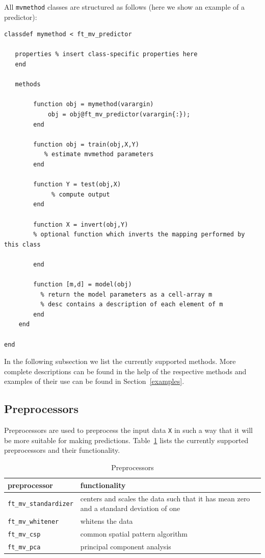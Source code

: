 \documentclass{article}
\renewcommand{\t}[1]{{\tt #1}}
\begin{document}
All \t{mvmethod} classes are structured as follows (here we show an example of a predictor):
\begin{verbatim}
classdef mymethod < ft_mv_predictor
 
   properties % insert class-specific properties here
   end
 
   methods
 
        function obj = mymethod(varargin)       
         	obj = obj@ft_mv_predictor(varargin{:});
        end        
 
        function obj = train(obj,X,Y)
           % estimate mvmethod parameters
        end
 
        function Y = test(obj,X)
        	 % compute output     
        end
 	
        function X = invert(obj,Y)
        % optional function which inverts the mapping performed by this class
        
        end
 
        function [m,d] = model(obj)
          % return the model parameters as a cell-array m
          % desc contains a description of each element of m 
        end
    end
 
end
\end{verbatim}

In the following subsection we list the currently supported methods. More complete descriptions can be found in the help of the respective methods and examples of their use can be found in Section~\ref{examples}.

\subsection{Preprocessors}

Preprocessors are used to preprocess the input data \t{X} in such a way that it will be more suitable for making predictions. Table~\ref{preprocessors} lists the currently supported preprocessors and their functionality.

\begin{table}[ht]
\centering
\caption{Preprocessors}
\begin{tabular}{p{}|p{}}
\bf{preprocessor} & \bf{functionality}\\
\hline
\t{ft\_mv\_standardizer} &  centers and scales the data such that it has mean zero and a standard deviation of one\\
\t{ft\_mv\_whitener} & whitens the data\\
\t{ft\_mv\_csp} & common spatial pattern algorithm\\
\t{ft\_mv\_pca} & principal component analysis
\end{tabular}
\label{preprocessors}
\end{table}
\end{document}
